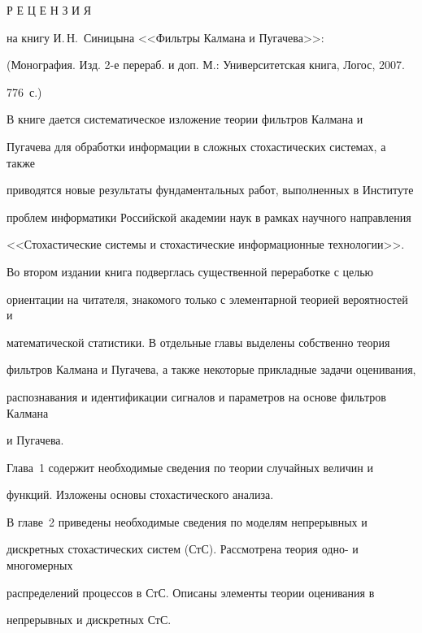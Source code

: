     Р Е Ц Е Н З И Я


     на книгу И.\,Н.~Синицына <<Фильтры Калмана и Пугачева>>: 


      (Монография. Изд. 2-е перераб. и доп. М.: Университетская книга, Логос, 2007. 


776~с.)


       


       


     В книге дается систематическое изложение теории фильтров Калмана и 


Пугачева для обработки информации в сложных стохастических системах, а также 


приводятся новые результаты фундаментальных работ, выполненных в Институте 


проблем информатики Российской академии наук в рамках научного направления 


<<Стохастические системы и стохастические информационные технологии>>. 


     


     Во втором издании книга подверглась существенной переработке с целью 


ориентации на читателя, знакомого только с элементарной теорией вероятностей и 


математической статистики. В отдельные главы выделены собственно теория 


фильтров Калмана и Пугачева, а также некоторые прикладные задачи оценивания, 


распознавания и идентификации сигналов и параметров на основе фильтров Калмана 


и Пугачева. 


     


     Глава~1 содержит необходимые сведения по теории случайных величин и 


функций. Изложены основы стохастического анализа.


     


     В главе~2 приведены необходимые сведения по моделям непрерывных и 


дискретных стохастических систем (СтС). Рассмотрена теория одно- и многомерных 


распределений процессов в СтС. Описаны элементы теории оценивания в 


непрерывных и дискретных СтС.


